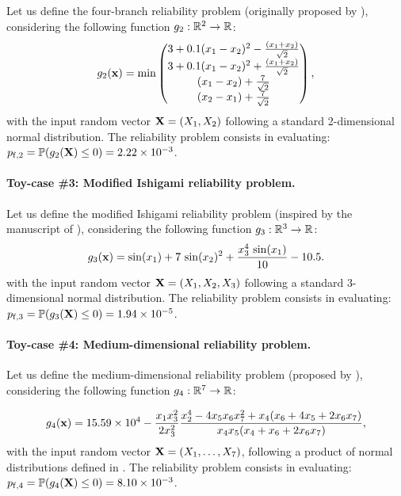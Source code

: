 Let us define the four-branch reliability problem (originally proposed by \cite{waarts2000structural}), considering the following function $g_2: \mathbb{R}^2 \rightarrow \mathbb{R}$:
\begin{align}
  g_2({\bf x}) = \min \begin{pmatrix}
    3+0.1(x_1-x_2)^2-\frac{(x_1+x_2)}{\sqrt{2}}\\
    3+0.1(x_1-x_2)^2+\frac{(x_1+x_2)}{\sqrt{2}}\\
    (x_1-x_2)+ \frac{7}{\sqrt{2}}\\
    (x_2-x_1)+ \frac{7}{\sqrt{2}}
  \end{pmatrix},
\end{align}
with the input random vector ${\bf X} = (X_1, X_2)$ following a standard 2-dimensional normal distribution. 
The reliability problem consists in evaluating: $p_{\mathrm{f}, 2} = \mathbb{P} ( g_2({\bf X}) \leq 0 ) =  2.22 \times 10^{-3}$.

\paragraph{Toy-case \#3: Modified Ishigami reliability problem.}
Let us define the modified Ishigami reliability problem (inspired by the manuscript of ), considering the following function $g_3: \mathbb{R}^3 \rightarrow \mathbb{R}$:
\begin{equation}
    g_3({\bf x}) = \sin(x_1) + 7 \, \sin(x_2)^2 + \frac{x_3^4 \, \sin(x_1)}{10} - 10.5.
\end{equation}
with the input random vector ${\bf X} = (X_1, X_2, X_3)$ following a standard 3-dimensional normal distribution. 
The reliability problem consists in evaluating: $p_{\mathrm{f}, 3} = \mathbb{P} ( g_3({\bf X}) \leq 0 ) =  1.94 \times 10^{-5}$.

\paragraph{Toy-case \#4: Medium-dimensional reliability problem.}

Let us define the medium-dimensional reliability problem (proposed by \cite{yun2018efficient}), considering the following function $g_4 : \mathbb{R}^7 \rightarrow \mathbb{R}$:

\begin{equation}
    g_4({\bf x}) = 15.59 \times 10^4 - \frac{x_1 x_3^2}{2 x_3^2} \frac{x_2^4 - 4 x_5 x_6 x_7^2 + x_4 (x_6 + 4 x_5 + 2 x_6 x_7)}{x_4 x_5 (x_4 + x_6 + 2 x_6 x_7)},
\end{equation}
with the input random vector ${\bf X} = (X_1, \dots, X_7)$, following a product of normal distributions defined in \cite{yun2018efficient}. 
The reliability problem consists in evaluating: $p_{\mathrm{f}, 4} = \mathbb{P} ( g_4({\bf X}) \leq 0 ) =  8.10 \times 10^{-3}$.


